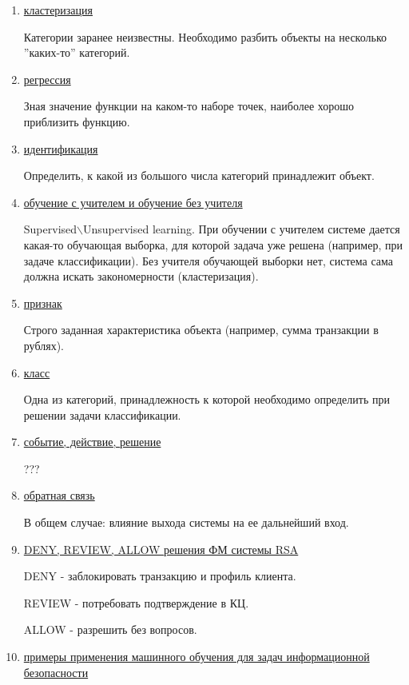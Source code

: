 \documentclass{proc}
\begin{document}
\begin{enumerate}
		\item \uline{кластеризация}
		
		Категории заранее неизвестны. Необходимо разбить объекты на несколько ''каких-то'' категорий.
		
		\item \uline{регрессия}
		
		Зная значение функции на каком-то наборе точек, наиболее хорошо приблизить функцию.
		
		\item \uline{идентификация}
		
		Определить, к какой из большого числа категорий принадлежит объект.
		
		\item \uline{обучение с учителем и обучение без учителя}
		
		Supervised$\backslash$Unsupervised learning. При обучении с учителем системе дается какая-то обучающая выборка, для которой задача уже решена (например, при задаче классификации). Без учителя обучающей выборки нет, система сама должна искать закономерности (кластеризация).
		
		\item \uline{признак}
		
		Строго заданная характеристика объекта (например, сумма транзакции в рублях).
		
		\item \uline{класс}
		
		Одна из категорий, принадлежность к которой необходимо определить при решении задачи классификации.
		
		\item \uline{событие, действие, решение}
		
		???
		
		\item \uline{обратная связь}
		
		В общем случае: влияние выхода системы на ее дальнейший вход.
		
		\item \uline{DENY, REVIEW, ALLOW решения ФМ системы RSA}
		
		DENY - заблокировать транзакцию и профиль клиента.
		
		REVIEW - потребовать подтверждение в КЦ.
		
		ALLOW - разрешить без вопросов.
		
		\item \uline{примеры применения машинного обучения для задач информационной безопасности}
		

\end{enumerate}
\end{document}
